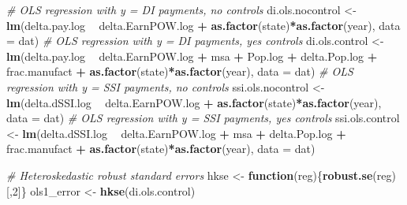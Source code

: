 \documentclass[
]{article}
\newenvironment{Shaded}{\begin{snugshade}}{\end{snugshade}}
\newcommand{\CommentTok}[1]{\textcolor[rgb]{0.56,0.35,0.01}{\textit{#1}}}
\newcommand{\ControlFlowTok}[1]{\textcolor[rgb]{0.13,0.29,0.53}{\textbf{#1}}}
\newcommand{\DataTypeTok}[1]{\textcolor[rgb]{0.13,0.29,0.53}{#1}}
\newcommand{\DecValTok}[1]{\textcolor[rgb]{0.00,0.00,0.81}{#1}}
\newcommand{\KeywordTok}[1]{\textcolor[rgb]{0.13,0.29,0.53}{\textbf{#1}}}
\newcommand{\NormalTok}[1]{#1}
\newcommand{\OperatorTok}[1]{\textcolor[rgb]{0.81,0.36,0.00}{\textbf{#1}}}
\newcommand{\StringTok}[1]{\textcolor[rgb]{0.31,0.60,0.02}{#1}}
\begin{document}
\begin{Shaded}
\begin{Highlighting}[]
\CommentTok{# OLS regression with y = DI payments, no controls }
\NormalTok{di.ols.nocontrol <-}\StringTok{ }\KeywordTok{lm}\NormalTok{(delta.pay.log }\OperatorTok{~}\StringTok{ }\NormalTok{delta.EarnPOW.log }\OperatorTok{+}\StringTok{ }
\StringTok{                         }\KeywordTok{as.factor}\NormalTok{(state)}\OperatorTok{*}\KeywordTok{as.factor}\NormalTok{(year), }\DataTypeTok{data =}\NormalTok{ dat)}
\CommentTok{# OLS regression with y = DI payments, yes controls }
\NormalTok{di.ols.control <-}\StringTok{ }\KeywordTok{lm}\NormalTok{(delta.pay.log }\OperatorTok{~}\StringTok{ }\NormalTok{delta.EarnPOW.log }\OperatorTok{+}\StringTok{ }\NormalTok{msa }\OperatorTok{+}\StringTok{ }
\StringTok{                       }\NormalTok{Pop.log }\OperatorTok{+}\StringTok{ }\NormalTok{delta.Pop.log }\OperatorTok{+}\StringTok{ }\NormalTok{frac.manufact }\OperatorTok{+}\StringTok{ }
\StringTok{                       }\KeywordTok{as.factor}\NormalTok{(state)}\OperatorTok{*}\KeywordTok{as.factor}\NormalTok{(year), }\DataTypeTok{data =}\NormalTok{ dat)}
\CommentTok{# OLS regression with y = SSI payments, no controls }
\NormalTok{ssi.ols.nocontrol <-}\StringTok{ }\KeywordTok{lm}\NormalTok{(delta.dSSI.log }\OperatorTok{~}\StringTok{ }\NormalTok{delta.EarnPOW.log }\OperatorTok{+}\StringTok{ }
\StringTok{                          }\KeywordTok{as.factor}\NormalTok{(state)}\OperatorTok{*}\KeywordTok{as.factor}\NormalTok{(year), }\DataTypeTok{data =}\NormalTok{ dat)}
\CommentTok{# OLS regression with y = SSI payments, yes controls }
\NormalTok{ssi.ols.control <-}\StringTok{ }\KeywordTok{lm}\NormalTok{(delta.dSSI.log }\OperatorTok{~}\StringTok{ }\NormalTok{delta.EarnPOW.log }\OperatorTok{+}\StringTok{ }\NormalTok{msa }\OperatorTok{+}\StringTok{ }
\StringTok{                        }\NormalTok{delta.Pop.log }\OperatorTok{+}\StringTok{ }\NormalTok{frac.manufact }\OperatorTok{+}\StringTok{ }
\StringTok{                        }\KeywordTok{as.factor}\NormalTok{(state)}\OperatorTok{*}\KeywordTok{as.factor}\NormalTok{(year), }\DataTypeTok{data =}\NormalTok{ dat)}
\end{Highlighting}
\end{Shaded}

\begin{Shaded}
\begin{Highlighting}[]
\CommentTok{# Heteroskedastic robust standard errors }
\NormalTok{hkse <-}\StringTok{ }\ControlFlowTok{function}\NormalTok{(reg)\{}\KeywordTok{robust.se}\NormalTok{(reg)[,}\DecValTok{2}\NormalTok{]\}}
\NormalTok{ols1_error <-}\StringTok{ }\KeywordTok{hkse}\NormalTok{(di.ols.control)}
\end{Highlighting}
\end{Shaded}
\end{document}
